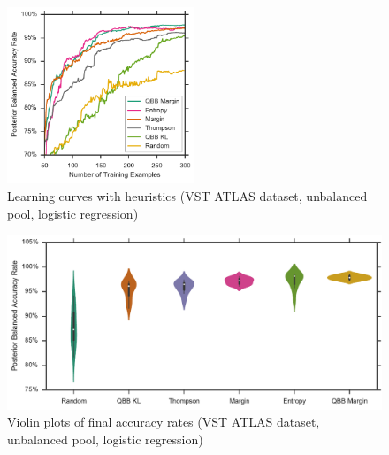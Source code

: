 \begin{figure}[p]
	\centering
	\includegraphics[width=0.5\textwidth]{figures/5_active/vstatlas_ul_ind_upper}
	\caption[Learning curves with heuristics (VST ATLAS, unbalanced, logistic)]{
		Learning curves with heuristics (VST ATLAS dataset, unbalanced pool, logistic regression)}
	\label{fig:vstatlas_ul_ind_upper}
\end{figure}



\begin{figure}[p]
	\centering
	\includegraphics[width=\textwidth]{figures/5_active/vstatlas_ul_ind_violin}
	\caption[Violin plots of final accuracy rates (VST ATLAS, unbalanced, logistic)]{
		Violin plots of final accuracy rates (VST ATLAS dataset, unbalanced pool, logistic regression)}
	\label{fig:vstatlas_ul_ind_violin}
\end{figure}

